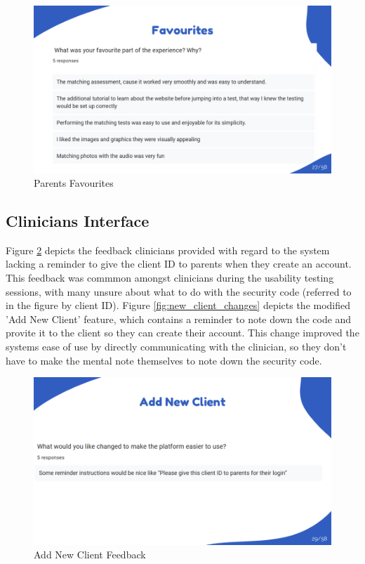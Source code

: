 \documentclass{article}
\begin{document}
\begin{figure}[H]
  \centering
  \includegraphics[width=\textwidth]{images/slide27.png}
  \caption{Parents Favourites}
  \label{fig:matching_feedback}
\end{figure}

\newpage

\subsection{Clinicians Interface}

\hspace{2em} Figure \ref{fig:new_client_feedback} depicts the feedback clinicians provided with regard to the system lacking a reminder to give the client ID to parents when they create an account.
This feedback was commmon amongst clinicians during the usability testing sessions, with many unsure about what to do with the security code (referred to in the figure by client ID).
Figure \ref{fig:new_client_changes} depicts the modified 'Add New Client' feature, which contains a reminder to note down the code and provite it to the client so they can create their account.
This change improved the systems ease of use by directly communicating with the clinician, so they don't have to make the mental note themselves to note down the security code.

\begin{figure}[H]
  \centering
  \includegraphics[width=\textwidth]{images/slide29.png}
  \caption{Add New Client Feedback}
  \label{fig:new_client_feedback}
\end{figure}
\end{document}
